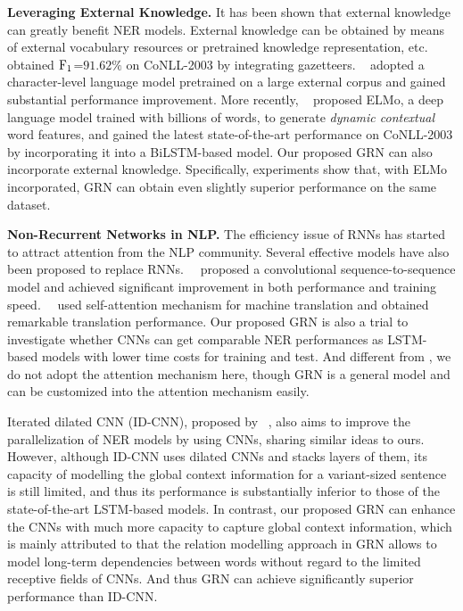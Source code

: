 \documentclass[letterpaper]{article} \usepackage{aaai19}  \usepackage{times}  \usepackage{helvet}  \usepackage{courier}  \usepackage{url}  \usepackage{graphicx}  \usepackage{amsmath}
\newcommand{\GRN}{GRN}
\begin{document}
\textbf{Leveraging External Knowledge.} It has been shown that external knowledge can greatly benefit NER models. External knowledge can be obtained by means of external vocabulary resources or pretrained knowledge representation, etc. \citeauthor{chiu2016named}~ obtained $\rm F_1$=$91.62\%$ on CoNLL-2003 by integrating gazetteers. \citeauthor{peters2017semi}~ adopted a character-level language model pretrained on a large external corpus and gained substantial performance improvement. More recently, \citeauthor{peters2018deep}~ proposed ELMo, a deep language model trained with billions of words, to generate \textit{dynamic contextual} word features, and gained the latest state-of-the-art performance on CoNLL-2003 by incorporating it into a BiLSTM-based model. Our proposed \GRN{} can also incorporate external knowledge. Specifically, experiments show that, with ELMo incorporated, \GRN{} can obtain even slightly superior performance on the same dataset.

\textbf{Non-Recurrent Networks in NLP.} The efficiency issue of RNNs has started to attract attention from the NLP community. Several effective models have also been proposed to replace RNNs.~\citeauthor{gehring2017convolutional}~ proposed a convolutional sequence-to-sequence model and achieved significant improvement in both performance and training speed.~\citeauthor{vaswani2017attention}~ used self-attention mechanism for machine translation and obtained remarkable translation performance. Our proposed \GRN{} is also a trial to investigate whether CNNs can get comparable NER performances as LSTM-based models with lower time costs for training and test. And different from \cite{gehring2017convolutional,vaswani2017attention}, we do not adopt the attention mechanism here, though \GRN{} is a general model and can be customized into the attention mechanism easily. 

Iterated dilated CNN (ID-CNN), proposed by \citeauthor{strubell2017fast}~, also aims to improve the parallelization of NER models by using CNNs, sharing similar ideas to ours. However, although ID-CNN uses dilated CNNs and stacks layers of them, its capacity of modelling the global context information for a variant-sized sentence is still limited, and thus its performance is substantially inferior to those of the state-of-the-art LSTM-based models. In contrast, our proposed \GRN{} can enhance the CNNs with much more capacity to capture global context information, which is mainly attributed to that the relation modelling approach in \GRN{} allows to model long-term dependencies between words without regard to the limited receptive fields of CNNs. And thus \GRN{} can achieve significantly superior performance than ID-CNN.
\end{document}
